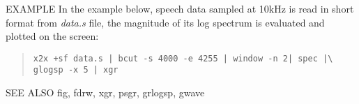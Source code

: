 \begin{qsection}{EXAMPLE}
In the example below, speech data sampled at 10kHz is read
in short format from {\em data.s} file,
the magnitude of its log spectrum is evaluated and plotted on the screen:
\begin{quote}
 \verb!x2x +sf data.s | bcut -s 4000 -e 4255 | window -n 2| spec |\! \\
 \verb!glogsp -x 5 | xgr!
\end{quote}
\begin{center}
 \leavevmode
\end{center}
\end{qsection}

\begin{qsection}{SEE ALSO}
 fig, fdrw, xgr, psgr, grlogsp, gwave
\end{qsection}

